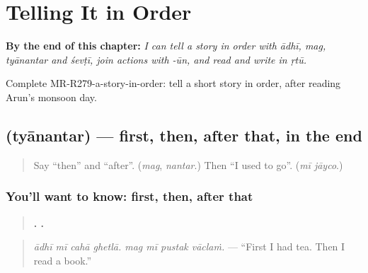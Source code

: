 
\chapter{Telling It in Order}
\label{ch:mr-telling-it-in-order}

\begin{chapteropening}
\textbf{By the end of this chapter:} \emph{I can tell a story in order with ādhī, mag, tyānantar and śevṭī, join actions with -ūn, and read and write  in ṛtū.}

Complete MR-R279-a-story-in-order: tell a short story in order, after reading Arun's monsoon day.
\end{chapteropening}

\section[\texorpdfstring{\mr{त्यानंतर} (tyānantar)}{त्यानंतर (tyānantar)}]{ (tyānantar) — first, then, after that, in the end}

\label{lesson:MR-C279-tyanantar}



\begin{quote}
Say \textquotedblleft{}then\textquotedblright{} and \textquotedblleft{}after\textquotedblright{}. (\emph{mag}, \emph{nantar}.) Then \textquotedblleft{}I used to go\textquotedblright{}. (\emph{mī jāyco}.)
\end{quote}

\subsection*{You'll want to know: first, then, after that}
\begin{quote}
\textbf{   .    .}
\end{quote}

\begin{quote}
\emph{ādhī mī cahā ghetlā. mag mī pustak vāclaṁ.} — \textquotedblleft{}First I had tea. Then I read a book.\textquotedblright{}
\end{quote}

